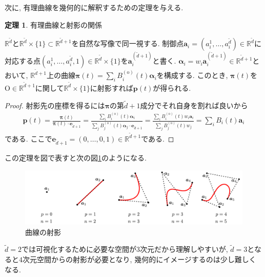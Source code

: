 \documentclass{jsarticle}
\newcommand\setR{\mathbb{R}}
\theoremstyle{definition}%
\newtheorem{thm}{定理}
\begin{document}
\newpage
次に, 有理曲線を幾何的に解釈するための定理を与える.
\begin{screen}
	\begin{thm}
		有理曲線と射影の関係

		$\mathbb{R}^{\tilde{d}}$と$\mathbb{R}^{\tilde{d}}\times\{1\}\subset\mathbb{R}^{{\tilde{d}}+1}$を自然な写像で同一視する.
		制御点$\bm{a}_i=(a_i^1,\dots,a_i^{\tilde{d}})\in\mathbb{R}^{\tilde{d}}$に対応する点$(a_i^1,\dots,a_i^{\tilde{d}},1)\in\mathbb{R}^{\tilde{d}}\times\{1\}$を$\bm{a}_i^{({\tilde{d}}+1)}$と書く.
		$\bm{\alpha}_i=w_i \bm{a}_i^{({\tilde{d}}+1)}\in\setR^{\tilde{d}+1}$とおいて, $\mathbb{R}^{{\tilde{d}}+1}$上の曲線$\bm{\pi}(t)=\sum\limits_iB_i^{(\text{o})}(t)\bm{\alpha}_i$を構成する.
		このとき, $\bm{\pi}(t)$を$\mathrm{O}\in\mathbb{R}^{{\tilde{d}}+1}$に関して$\mathbb{R}^{\tilde{d}}\times\{1\}$に射影すれば$\bm{p}(t)$が得られる.
	\end{thm}
\end{screen}
\begin{proof}
	射影先の座標を得るには$\bm{\pi}$の第${\tilde{d}}+1$成分でそれ自身を割れば良いから
	\begin{align}
		\bm{p}(t)
		=\frac{\bm{\pi}(t)}{\bm{\pi}(t)\cdot \bm{e}_{\tilde{d}+1}}
		=\frac{\sum\limits_i B_i^{(\text{o})}(t)\bm{\alpha}_i}{\sum\limits_j B_j^{(\text{o})}(t)\bm{\alpha}_j\cdot\bm{e}_{\tilde{d}+1}}
		=\frac{\sum\limits_i B_i^{(\text{o})}(t)w_i\bm{a}_i}{\sum\limits_j B_j^{(\text{o})}(t)w_j}
		=\sum_i {B}_i(t)\bm{a}_i
	\end{align}
	である.
	ここで$\bm{e}_{\tilde{d}+1}=(0,\dots,0,1)\in\mathbb{R}^{\tilde{d}+1}$である.
\end{proof}

この定理を図で表すと次の図\ref{Fig201}のようになる.
\begin{figure}[H]
	\centering
    \includegraphics[page=4,clip,width=120mm]{fig.pdf}
	\caption{曲線の射影}
	\label{Fig201}
\end{figure}
\noindent
$\tilde{d}=2$では可視化するために必要な空間が3次元だから理解しやすいが, $\tilde{d}=3$となると$4$次元空間からの射影が必要となり, 幾何的にイメージするのは少し難しくなる.
\end{document}
